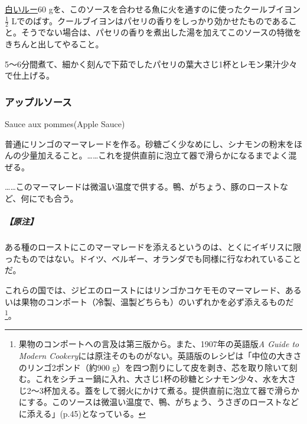 \begin{recette}
\protect\hyperlink{roux-blanc}{白いルー}60
gを、このソースを合わせる魚に火を通すのに使ったクールブイヨン
\(\frac{1}{2}\)
Lでのばす。クールブイヨンはパセリの香りをしっかり効かせたものであること。そうでない場合は、パセリの香りを煮出した湯を加えてこのソースの特徴をきちんと出してやること。

5〜6分間煮て、細かく刻んで下茹でしたパセリの葉大さじ1杯とレモン果汁少々で仕上げる。

\atoaki{}

\hypertarget{apple-sauce}{%
\subsubsection{アップルソース}\label{apple-sauce}}

\begin{frsubenv}

Sauce aux pommes\hspace{1em}\normalfont(Apple Sauce)

\end{frsubenv}


普通にリンゴのマーマレードを作る。砂糖ごく少なめにし、シナモンの粉末をほんの少量加えること。\ldots{}\ldots{}これを提供直前に泡立て器で滑らかになるまでよく混ぜる。

\ldots{}\ldots{}このマーマレードは微温い温度で供する。鴨、がちょう、豚のローストなど、何にでも合う。

\hypertarget{nota-apple-sauce}{%
\subparagraph{【原注】}\label{nota-apple-sauce}}

ある種のローストにこのマーマレードを添えるというのは、とくにイギリスに限ったものではない。ドイツ、ベルギー、オランダでも同様に行なわれていることだ。

これらの国では、ジビエのローストにはリンゴかコケモモのマーマレード、あるいは果物のコンポート（冷製、温製どちらも）のいずれかを必ず添えるものだ\footnote{果物のコンポートへの言及は第三版から。また、1907年の英語版\emph{A
  Guide to Modern
  Cookery}には原注そのものがない。英語版のレシピは「中位の大きさのリンゴ2ポンド（約900
  g）を四つ割りにして皮を剥き、芯を取り除いて刻む。これをシチュー鍋に入れ、大さじ1杯の砂糖とシナモン少々、水を大さじ2〜3杯加える。蓋をして弱火にかけて煮る。提供直前に泡立て器で滑らかにする。このソースは微温い温度で、鴨、がちょう、うさぎのローストなどに添える」(p.45)となっている。}。


\end{recette}
